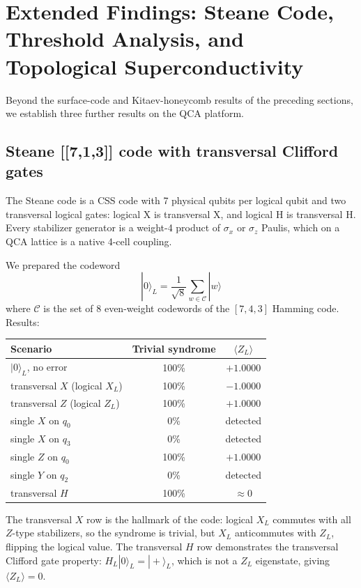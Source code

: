 \section{Extended Findings: Steane Code, Threshold Analysis, and Topological Superconductivity}
\label{sec:extended}

Beyond the surface-code and Kitaev-honeycomb results of the
preceding sections, we establish three further results on the
QCA platform.

\subsection{Steane [[7,1,3]] code with transversal Clifford gates}

The Steane code is a CSS code with 7 physical qubits per logical
qubit and two transversal logical gates: logical X is transversal
X, and logical H is transversal H.  Every stabilizer generator
is a weight-4 product of $\sigma_x$ or $\sigma_z$ Paulis, which
on a QCA lattice is a native 4-cell coupling.

We prepared the codeword
\begin{equation}
|0\rangle_L = \frac{1}{\sqrt{8}} \sum_{w \in \mathcal{C}} |w\rangle
\end{equation}
where $\mathcal{C}$ is the set of 8 even-weight codewords of the
$[7,4,3]$ Hamming code.  Results:

\begin{center}
\begin{tabular}{lcc}
\hline
Scenario & Trivial syndrome & $\langle Z_L \rangle$ \\
\hline
$|0\rangle_L$, no error & 100\% & $+1.0000$ \\
transversal $X$ (logical $X_L$) & 100\% & $-1.0000$ \\
transversal $Z$ (logical $Z_L$) & 100\% & $+1.0000$ \\
single $X$ on $q_0$ & 0\% & detected \\
single $X$ on $q_3$ & 0\% & detected \\
single $Z$ on $q_0$ & 100\% & $+1.0000$ \\
single $Y$ on $q_2$ & 0\% & detected \\
transversal $H$ & 100\% & $\approx 0$ \\
\hline
\end{tabular}
\end{center}

The transversal $X$ row is the hallmark of the code: logical
$X_L$ commutes with all $Z$-type stabilizers, so the syndrome is
trivial, but $X_L$ anticommutes with $Z_L$, flipping the logical
value.  The transversal $H$ row demonstrates the transversal
Clifford gate property: $H_L |0\rangle_L = |+\rangle_L$, which
is not a $Z_L$ eigenstate, giving $\langle Z_L \rangle = 0$.

